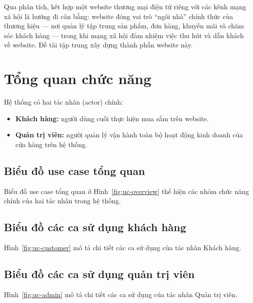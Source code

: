 Qua phân tích, kết hợp một website thương mại điện tử riêng với các kênh mạng xã hội là hướng đi
cân bằng: website đóng vai trò ``ngôi nhà'' chính thức của thương hiệu --- nơi quản lý tập trung
sản phẩm, đơn hàng, khuyến mãi và chăm sóc khách hàng --- trong khi mạng xã hội đảm nhiệm việc
thu hút và dẫn khách về website. Đề tài \brandName{} tập trung xây dựng thành phần website này.

\section{Tổng quan chức năng}

Hệ thống \brandName{} có hai tác nhân (actor) chính:

\begin{itemize}
  \item \textbf{Khách hàng:} người dùng cuối thực hiện mua sắm trên website.
  \item \textbf{Quản trị viên:} người quản lý vận hành toàn bộ hoạt động kinh doanh của cửa hàng
  trên hệ thống.
\end{itemize}

\subsection{Biểu đồ use case tổng quan}

Biểu đồ use case tổng quan ở Hình~\ref{fig:uc-overview} thể hiện các nhóm chức năng chính của
hai tác nhân trong hệ thống.


\subsection{Biểu đồ các ca sử dụng khách hàng}

Hình~\ref{fig:uc-customer} mô tả chi tiết các ca sử dụng của tác nhân Khách hàng.


\subsection{Biểu đồ các ca sử dụng quản trị viên}

Hình~\ref{fig:uc-admin} mô tả chi tiết các ca sử dụng của tác nhân Quản trị viên.

